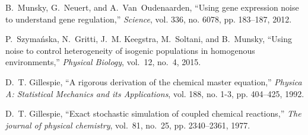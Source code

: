 \documentclass[12pt]{iopart}
\begin{document}
\begin{thebibliography}{10}
B.~Munsky, G.~Neuert, and A.~Van~Oudenaarden, ``{Using gene expression noise to
  understand gene regulation},'' \emph{Science}, vol. 336, no. 6078, pp.
  183--187, 2012.

P.~Szyma{\'{n}}ska, N.~Gritti, J.~M. Keegstra, M.~Soltani, and B.~Munsky,
  ``{Using noise to control heterogeneity of isogenic populations in homogenous
  environments},'' \emph{Physical Biology}, vol.~12, no.~4, 2015.

D.~T. Gillespie, ``{A rigorous derivation of the chemical master equation},''
  \emph{Physica A: Statistical Mechanics and its Applications}, vol. 188, no.
  1-3, pp. 404--425, 1992.

D.~T. Gillespie, ``{Exact stochastic simulation of coupled chemical reactions},''
  \emph{The journal of physical chemistry}, vol.~81, no.~25, pp. 2340--2361,
  1977.

\end{thebibliography}
\end{document}
